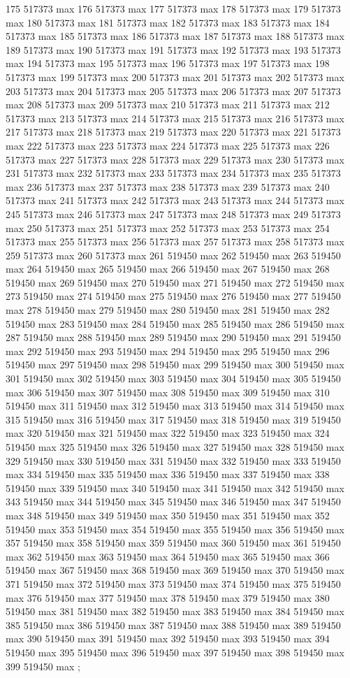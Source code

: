 {175 517373 max
176 517373 max
177 517373 max
178 517373 max
179 517373 max
180 517373 max
181 517373 max
182 517373 max
183 517373 max
184 517373 max
185 517373 max
186 517373 max
187 517373 max
188 517373 max
189 517373 max
190 517373 max
191 517373 max
192 517373 max
193 517373 max
194 517373 max
195 517373 max
196 517373 max
197 517373 max
198 517373 max
199 517373 max
200 517373 max
201 517373 max
202 517373 max
203 517373 max
204 517373 max
205 517373 max
206 517373 max
207 517373 max
208 517373 max
209 517373 max
210 517373 max
211 517373 max
212 517373 max
213 517373 max
214 517373 max
215 517373 max
216 517373 max
217 517373 max
218 517373 max
219 517373 max
220 517373 max
221 517373 max
222 517373 max
223 517373 max
224 517373 max
225 517373 max
226 517373 max
227 517373 max
228 517373 max
229 517373 max
230 517373 max
231 517373 max
232 517373 max
233 517373 max
234 517373 max
235 517373 max
236 517373 max
237 517373 max
238 517373 max
239 517373 max
240 517373 max
241 517373 max
242 517373 max
243 517373 max
244 517373 max
245 517373 max
246 517373 max
247 517373 max
248 517373 max
249 517373 max
250 517373 max
251 517373 max
252 517373 max
253 517373 max
254 517373 max
255 517373 max
256 517373 max
257 517373 max
258 517373 max
259 517373 max
260 517373 max
261 519450 max
262 519450 max
263 519450 max
264 519450 max
265 519450 max
266 519450 max
267 519450 max
268 519450 max
269 519450 max
270 519450 max
271 519450 max
272 519450 max
273 519450 max
274 519450 max
275 519450 max
276 519450 max
277 519450 max
278 519450 max
279 519450 max
280 519450 max
281 519450 max
282 519450 max
283 519450 max
284 519450 max
285 519450 max
286 519450 max
287 519450 max
288 519450 max
289 519450 max
290 519450 max
291 519450 max
292 519450 max
293 519450 max
294 519450 max
295 519450 max
296 519450 max
297 519450 max
298 519450 max
299 519450 max
300 519450 max
301 519450 max
302 519450 max
303 519450 max
304 519450 max
305 519450 max
306 519450 max
307 519450 max
308 519450 max
309 519450 max
310 519450 max
311 519450 max
312 519450 max
313 519450 max
314 519450 max
315 519450 max
316 519450 max
317 519450 max
318 519450 max
319 519450 max
320 519450 max
321 519450 max
322 519450 max
323 519450 max
324 519450 max
325 519450 max
326 519450 max
327 519450 max
328 519450 max
329 519450 max
330 519450 max
331 519450 max
332 519450 max
333 519450 max
334 519450 max
335 519450 max
336 519450 max
337 519450 max
338 519450 max
339 519450 max
340 519450 max
341 519450 max
342 519450 max
343 519450 max
344 519450 max
345 519450 max
346 519450 max
347 519450 max
348 519450 max
349 519450 max
350 519450 max
351 519450 max
352 519450 max
353 519450 max
354 519450 max
355 519450 max
356 519450 max
357 519450 max
358 519450 max
359 519450 max
360 519450 max
361 519450 max
362 519450 max
363 519450 max
364 519450 max
365 519450 max
366 519450 max
367 519450 max
368 519450 max
369 519450 max
370 519450 max
371 519450 max
372 519450 max
373 519450 max
374 519450 max
375 519450 max
376 519450 max
377 519450 max
378 519450 max
379 519450 max
380 519450 max
381 519450 max
382 519450 max
383 519450 max
384 519450 max
385 519450 max
386 519450 max
387 519450 max
388 519450 max
389 519450 max
390 519450 max
391 519450 max
392 519450 max
393 519450 max
394 519450 max
395 519450 max
396 519450 max
397 519450 max
398 519450 max
399 519450 max
};
